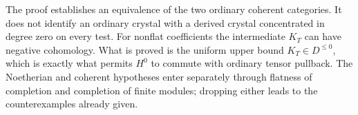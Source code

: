 \begin{remark}\label{rem:DE-E2-coherent-derived-heart}
The proof establishes an equivalence of the two ordinary coherent categories.  It does not identify an ordinary crystal with a derived crystal concentrated in degree zero on every test.  For nonflat coefficients the intermediate $K_T$ can have negative cohomology.  What is proved is the uniform upper bound $K_T\in D^{\leq0}$, which is exactly what permits $H^0$ to commute with ordinary tensor pullback.  The Noetherian and coherent hypotheses enter separately through flatness of completion and completion of finite modules; dropping either leads to the counterexamples already given.
\end{remark}
